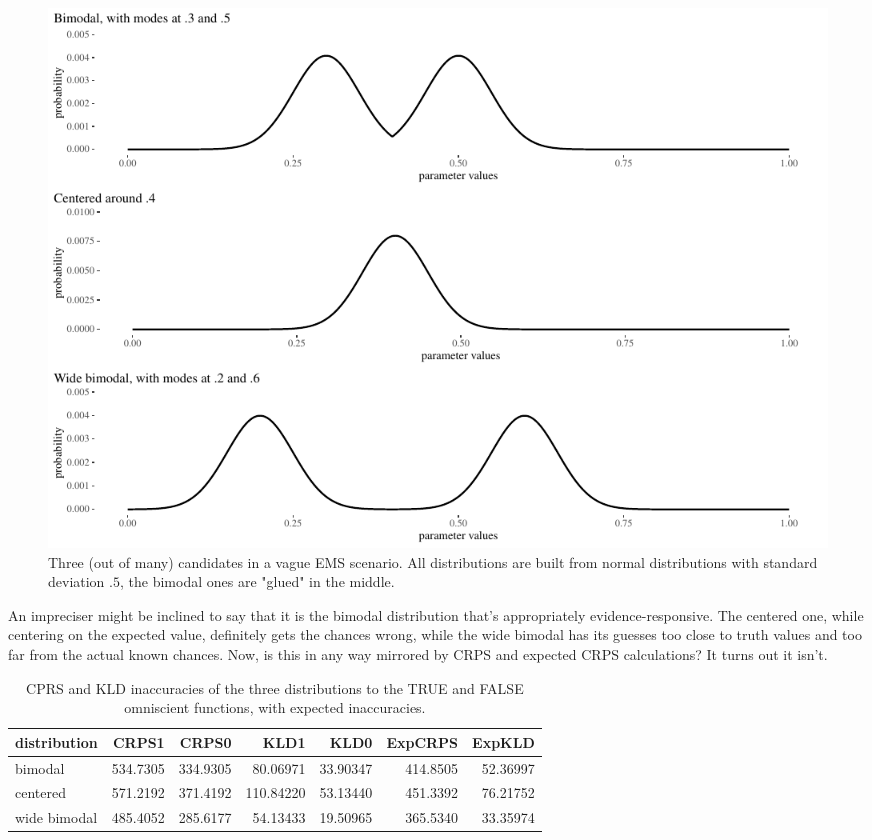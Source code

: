 \documentclass[
  10pt,
  dvipsnames,enabledeprecatedfontcommands]{scrartcl}
\begin{document}
\begin{figure}[H]

\begin{center}\includegraphics[width=1\linewidth]{imprecision_philosophical_paper2_files/figure-latex/figEMC-1} \end{center}
\caption{Three (out of many) candidates in a vague EMS scenario. All distributions are built from normal  distributions with standard deviation $.5$, the bimodal ones are "glued" in the middle.}
\label{fig:EMC}
\end{figure}

An impreciser might be inclined to say that it is the bimodal
distribution that's appropriately evidence-responsive. The centered one,
while centering on the expected value, definitely gets the chances
wrong, while the wide bimodal has its guesses too close to truth values
and too far from the actual known chances. Now, is this in any way
mirrored by CRPS and expected CRPS calculations? It turns out it isn't.

\begin{table}[H]
\centering
\begin{tabular}{lrrrrrr}
\toprule
distribution & CRPS1 & CRPS0 & KLD1 & KLD0 & ExpCRPS & ExpKLD\\
\midrule
bimodal & 534.7305 & 334.9305 & 80.06971 & 33.90347 & 414.8505 & 52.36997\\
centered & 571.2192 & 371.4192 & 110.84220 & 53.13440 & 451.3392 & 76.21752\\
wide bimodal & 485.4052 & 285.6177 & 54.13433 & 19.50965 & 365.5340 & 33.35974\\
\bottomrule
\end{tabular}
\caption{CPRS and KLD inaccuracies of the three distributions to the TRUE and FALSE omniscient functions, with expected inaccuracies.}
\end{table}
\end{document}
